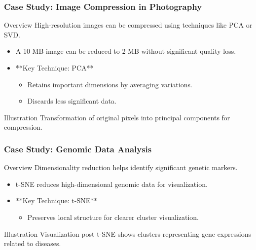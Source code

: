 \documentclass[aspectratio=169]{beamer}
\begin{document}
\begin{frame}[fragile]
    \frametitle{Case Study: Image Compression in Photography}
    \begin{block}{Overview}
        High-resolution images can be compressed using techniques like PCA or SVD.
    \end{block}
    \begin{itemize}
        \item A 10 MB image can be reduced to 2 MB without significant quality loss.
        \item **Key Technique: PCA**
          \begin{itemize}
              \item Retains important dimensions by averaging variations.
              \item Discards less significant data.
          \end{itemize}
    \end{itemize}
    \begin{block}{Illustration}
        Transformation of original pixels into principal components for compression.
    \end{block}
\end{frame}

\begin{frame}[fragile]
    \frametitle{Case Study: Genomic Data Analysis}
    \begin{block}{Overview}
        Dimensionality reduction helps identify significant genetic markers.
    \end{block}
    \begin{itemize}
        \item t-SNE reduces high-dimensional genomic data for visualization.
        \item **Key Technique: t-SNE**
          \begin{itemize}
              \item Preserves local structure for clearer cluster visualization.
          \end{itemize}
    \end{itemize}
    \begin{block}{Illustration}
        Visualization post t-SNE shows clusters representing gene expressions related to diseases.
    \end{block}
\end{frame}
\end{document}
